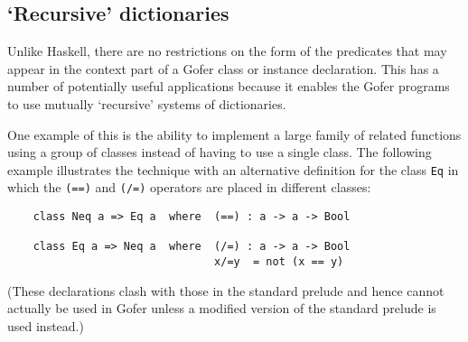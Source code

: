 \subsection{`Recursive' dictionaries}
Unlike Haskell, there are no restrictions on the form of the predicates
that may appear in the context  part  of  a  Gofer  class  or  instance
declaration.  This has a  number  of  potentially  useful  applications
because it enables the  Gofer  programs  to  use  mutually  `recursive'
systems of dictionaries.

One example of this is the ability  to  implement  a  large  family  of
related functions using a group of classes instead of having to  use  a
single class.  The following example illustrates the technique with  an
alternative definition for the class \verb"Eq" 
in  which  the  \verb"(==)"  and  \verb"(/=)"
operators are placed in different classes:
\begin{verbatim}
    class Neq a => Eq a  where  (==) : a -> a -> Bool

    class Eq a => Neq a  where  (/=) : a -> a -> Bool
                                x/=y  = not (x == y)
\end{verbatim}
(These declarations clash with those in the standard prelude and
hence cannot actually be used in Gofer unless a modified version of the
standard prelude is used instead.)

